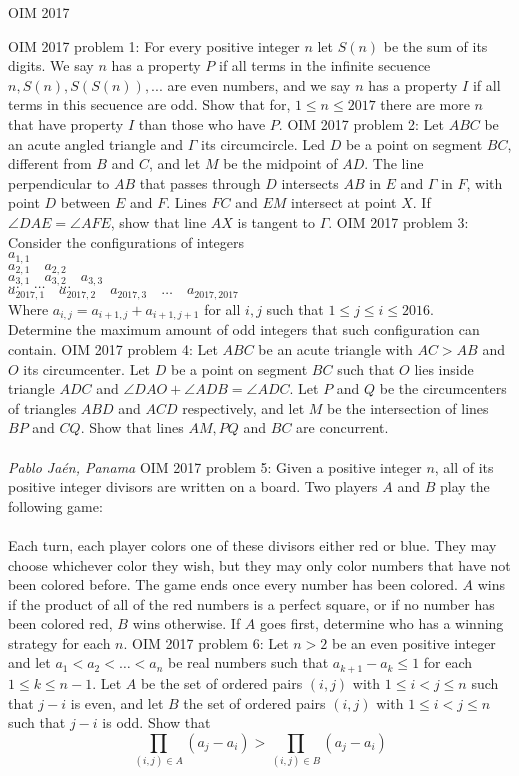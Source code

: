 OIM 2017 

OIM 2017 problem 1:  For every positive integer $n$ let $S(n)$ be the sum of its digits. We say $n$ has a property $P$ if all terms in the infinite secuence $n, S(n), S(S(n)),...$ are even numbers, and we say $n$ has a property $I$ if all terms in this secuence are odd. Show that for, $1 \le n \le 2017$ there are more $n$ that have property $I$ than those who have $P$. 
OIM 2017 problem 2:  Let $ABC$ be an acute angled triangle and $\Gamma$ its circumcircle. Led $D$ be a point on segment $BC$, different from $B$ and $C$, and let $M$ be the midpoint of $AD$. The line perpendicular to $AB$ that passes through $D$ intersects $AB$ in $E$ and $\Gamma$ in $F$, with point $D$ between $E$ and $F$. Lines $FC$ and $EM$ intersect at point $X$. If $\angle DAE = \angle AFE$, show that line $AX$ is tangent to $\Gamma$. 
OIM 2017 problem 3:  Consider the configurations of integers \\
$a_{1,1}$ \\
$a_{2,1} \quad a_{2,2}$ \\
$a_{3,1} \quad a_{3,2} \quad a_{3,3}$ \\
$\dots \quad \dots \quad \dots$ \\
$a_{2017,1} \quad a_{2017,2} \quad a_{2017,3} \quad \dots \quad a_{2017,2017}$ \\
Where $a_{i,j} = a_{i+1,j} + a_{i+1,j+1}$ for all $i,j$ such that $1 \leq j \leq i \leq 2016$. \\
Determine the maximum amount of odd integers that such configuration can contain. 
OIM 2017 problem 4:  Let $ABC$ be an acute triangle with $AC > AB$ and $O$ its circumcenter. Let $D$ be a point on segment $BC$ such that $O$ lies inside triangle $ADC$ and $\angle DAO + \angle ADB = \angle ADC$. Let $P$ and $Q$ be the circumcenters of triangles $ABD$ and $ACD$ respectively, and let $M$ be the intersection of lines $BP$ and $CQ$. Show that lines $AM, PQ$ and $BC$ are concurrent. \\\\
\textit{Pablo Jaén, Panama} 
OIM 2017 problem 5:  Given a positive integer $n$, all of its positive integer divisors are written on a board. Two players $A$ and $B$ play the following game: \\\\
Each turn, each player colors one of these divisors either red or blue. They may choose whichever color they wish, but they may only color numbers that have not been colored before. The game ends once every number has been colored. $A$ wins if the product of all of the red numbers is a perfect square, or if no number has been colored red, $B$ wins otherwise. If $A$ goes first, determine who has a winning strategy for each $n$. 
OIM 2017 problem 6:  Let $n > 2$ be an even positive integer and let $a_1 < a_2 < \dots < a_n$ be real numbers such that $a_{k + 1} - a_k \leq 1$ for each $1 \leq k \leq n - 1$. Let $A$ be the set of ordered pairs $(i, j)$ with $1 \leq i < j \leq n$ such that $j - i$ is even, and let $B$ the set of ordered pairs $(i, j)$ with $1 \leq i < j \leq n$ such that $j - i$ is odd. Show that
\[ \prod_{(i, j) \in A} (a_j - a_i) > \prod_{(i, j) \in B} (a_j - a_i) \] 

